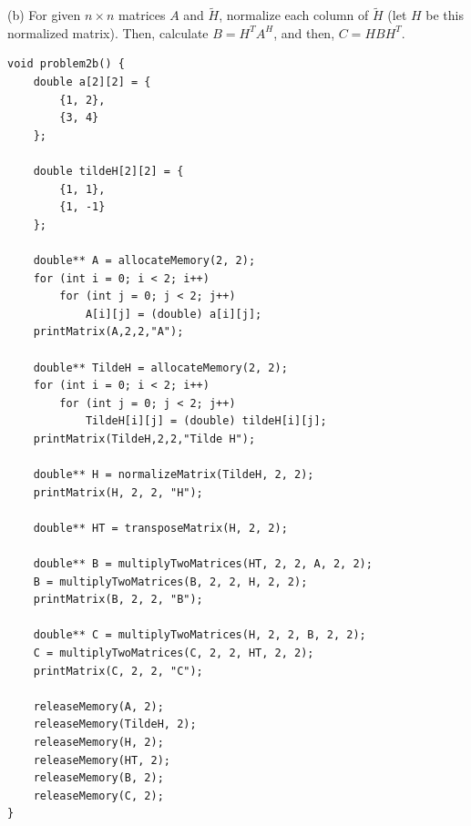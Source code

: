 (b) For given $n\times n$ matrices $A$ and $\tilde{H}$, normalize each column of $\tilde{H}$ (let $H$ be this normalized matrix).
Then, calculate $B = H^T A^H$, and then, $C = HBH^T$.
\begin{verbatim}
void problem2b() {
    double a[2][2] = {
        {1, 2},
        {3, 4}
    };
    
    double tildeH[2][2] = {
        {1, 1},
        {1, -1}
    };
    
    double** A = allocateMemory(2, 2);
    for (int i = 0; i < 2; i++)
        for (int j = 0; j < 2; j++)
            A[i][j] = (double) a[i][j];
    printMatrix(A,2,2,"A");
    
    double** TildeH = allocateMemory(2, 2);
    for (int i = 0; i < 2; i++)
        for (int j = 0; j < 2; j++)
            TildeH[i][j] = (double) tildeH[i][j];
    printMatrix(TildeH,2,2,"Tilde H");
    
    double** H = normalizeMatrix(TildeH, 2, 2);
    printMatrix(H, 2, 2, "H");
    
    double** HT = transposeMatrix(H, 2, 2);
    
    double** B = multiplyTwoMatrices(HT, 2, 2, A, 2, 2);
    B = multiplyTwoMatrices(B, 2, 2, H, 2, 2);
    printMatrix(B, 2, 2, "B");
    
    double** C = multiplyTwoMatrices(H, 2, 2, B, 2, 2);
    C = multiplyTwoMatrices(C, 2, 2, HT, 2, 2);
    printMatrix(C, 2, 2, "C");

    releaseMemory(A, 2);
    releaseMemory(TildeH, 2);
    releaseMemory(H, 2);
    releaseMemory(HT, 2);
    releaseMemory(B, 2);
    releaseMemory(C, 2);
}
\end{verbatim}
